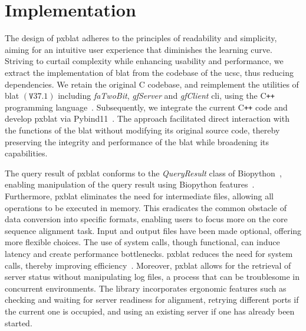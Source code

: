 \section*{Implementation}\label{sec:implementation}

The design of \gls{pxblat} adheres to the principles of readability and simplicity, aiming for an intuitive user experience that diminishes the learning curve.
Striving to curtail complexity while enhancing usability and performance, we extract the implementation of \gls{blat} from the codebase of the \gls{ucsc}, thus reducing dependencies.
We retain the original C codebase, and reimplement the utilities of \gls{blat} \(\left(\mathtt{V}37.1\right)\) including \emph{faTwoBit}, \emph{gfServer} and \emph{gfClient} \gls{cli}, using the C\texttt{++} programming language~\citep{kent2002blat}.
Subsequently, we integrate the current C\texttt{++} code and develop \gls{pxblat} via Pybind11~\citep{pybind11}.
The approach facilitated direct interaction with the functions of the \gls{blat} without modifying its original source code, thereby preserving the integrity and performance of the \gls{blat} while broadening its capabilities.

The query result of \gls{pxblat} conforms to the \emph{QueryResult} class of Biopython~\citep{cock2009biopython}, enabling  manipulation of the query result using Biopython features~.
Furthermore, \gls{pxblat} eliminates the need for intermediate files, allowing all operations to be executed in memory.
This eradicates the common obstacle of data conversion into specific formats, enabling users to focus more on the core sequence alignment task.
Input and output files have been made optional, offering more flexible choices.
The use of system calls, though functional, can induce latency and create performance bottlenecks.
\gls{pxblat} reduces the need for system calls, thereby improving efficiency~.
Moreover, \gls{pxblat} allows for the retrieval of server status without manipulating log files, a process that can be troublesome in concurrent environments.
The library incorporates ergonomic features such as checking and waiting for server readiness for alignment, retrying different ports if the current one is occupied, and using an existing server if one has already been started.

